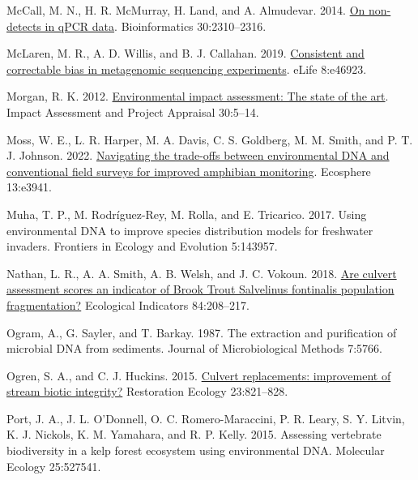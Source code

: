 \documentclass[
]{article}
\newlength{\cslhangindent}
\newlength{\cslentryspacingunit} %
\newenvironment{CSLReferences}[2] %
 {%
  \setlength{\parindent}{0pt}
  \ifodd #1
  \let\oldpar\par
  \def\par{\hangindent=\cslhangindent\oldpar}
  \fi
  \setlength{\parskip}{#2\cslentryspacingunit}
 }%
 {}
\begin{document}
\begin{CSLReferences}{1}{0}
\leavevmode{}%
McCall, M. N., H. R. McMurray, H. Land, and A. Almudevar. 2014.
\href{https://doi.org/10.1093/bioinformatics/btu239}{On non-detects in
qPCR data}. Bioinformatics 30:2310--2316.

\leavevmode{}%
McLaren, M. R., A. D. Willis, and B. J. Callahan. 2019.
\href{https://doi.org/10.7554/eLife.46923}{Consistent and correctable
bias in metagenomic sequencing experiments}. eLife 8:e46923.

\leavevmode{}%
Morgan, R. K. 2012.
\href{https://doi.org/10.1080/14615517.2012.661557}{Environmental impact
assessment: The state of the art}. Impact Assessment and Project
Appraisal 30:5--14.

\leavevmode{}%
Moss, W. E., L. R. Harper, M. A. Davis, C. S. Goldberg, M. M. Smith, and
P. T. J. Johnson. 2022.
\href{https://doi.org/10.1002/ecs2.3941}{Navigating the trade-offs
between environmental DNA and conventional field surveys for improved
amphibian monitoring}. Ecosphere 13:e3941.

\leavevmode{}%
Muha, T. P., M. Rodríguez-Rey, M. Rolla, and E. Tricarico. 2017. Using
environmental DNA to improve species distribution models for freshwater
invaders. Frontiers in Ecology and Evolution 5:143957.

\leavevmode{}%
Nathan, L. R., A. A. Smith, A. B. Welsh, and J. C. Vokoun. 2018.
\href{https://doi.org/10.1016/j.ecolind.2017.08.033}{Are culvert
assessment scores an indicator of Brook Trout Salvelinus fontinalis
population fragmentation?} Ecological Indicators 84:208--217.

\leavevmode{}%
Ogram, A., G. Sayler, and T. Barkay. 1987. The extraction and
purification of microbial DNA from sediments. Journal of Microbiological
Methods 7:5766.

\leavevmode{}%
Ogren, S. A., and C. J. Huckins. 2015.
\href{https://doi.org/10.1111/rec.12250}{Culvert replacements:
improvement of stream biotic integrity?} Restoration Ecology
23:821--828.

\leavevmode{}%
Port, J. A., J. L. O'Donnell, O. C. Romero-Maraccini, P. R. Leary, S. Y.
Litvin, K. J. Nickols, K. M. Yamahara, and R. P. Kelly. 2015. Assessing
vertebrate biodiversity in a kelp forest ecosystem using environmental
DNA. Molecular Ecology 25:527541.


\end{CSLReferences}
\end{document}
